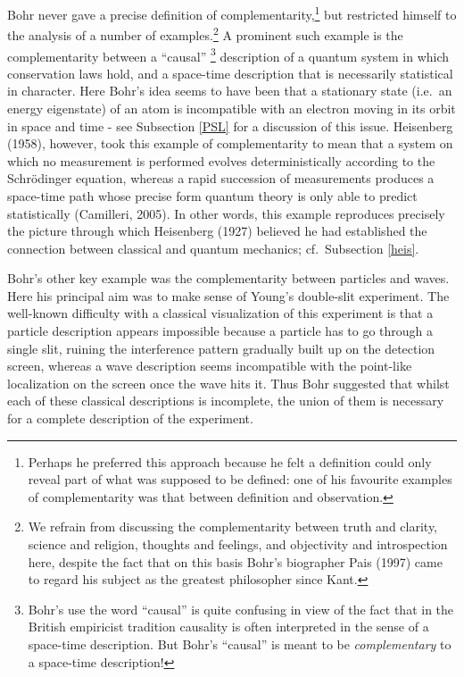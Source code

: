 \documentclass[12pt,titlepage]{article}
\begin{document}
Bohr never gave a precise definition of complementarity,\footnote{Perhaps he preferred this approach because he felt a definition could only reveal part of what was supposed to be defined: one of his favourite examples of complementarity was that between definition and observation.} but restricted himself to the analysis of a number of examples.\footnote{We refrain from discussing the complementarity between truth and clarity, science and religion, thoughts and feelings, and objectivity and introspection here, despite the fact that on this basis Bohr's biographer Pais (1997) came to regard his subject as the greatest philosopher since Kant.}
A prominent such example is the complementarity between
a ``causal'' \footnote{\label{caudet} Bohr's use the word ``causal''  is quite confusing in view of the fact that in the British empiricist tradition causality is often interpreted in the sense of a space-time description. But Bohr's ``causal'' is meant to be {\it complementary} to a space-time description!}  description of a quantum system in which conservation laws hold, and a space-time description that is necessarily statistical in character. Here Bohr's  idea seems to have been that a stationary state (i.e.\ an energy eigenstate)  of an atom is incompatible with an electron moving in its orbit in space and time - see
Subsection \ref{PSL} for a discussion of this issue. Heisenberg (1958), however, took this example of complementarity to mean that 
a system on which no measurement is performed evolves 
deterministically according to the Schr\"{o}dinger equation, whereas  a rapid succession of measurements produces a space-time path whose precise form quantum theory is only able to predict statistically (Camilleri, 2005). In other words, this example reproduces precisely the picture through  which Heisenberg (1927) believed he had established the connection between classical and quantum mechanics; cf.\ Subsection \ref{heis}. 

Bohr's other key example was the complementarity between particles and waves. Here his principal  aim was to make sense of Young's double-slit experiment. The well-known difficulty with a classical visualization of this experiment is that a particle description appears  impossible because a particle has to go through a single slit, ruining the interference pattern gradually built up on the detection screen, whereas a wave description seems incompatible with the point-like localization on the screen once the wave hits it. Thus Bohr suggested that whilst each  of these classical descriptions is incomplete, the union of them is necessary for a complete description of the experiment.
\end{document}
